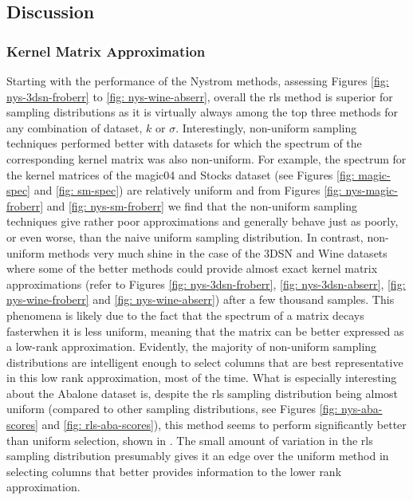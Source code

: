 \subsection{Discussion}\label{Section5.3}

\subsubsection{Kernel Matrix Approximation}\label{Section5.3.1}

Starting with the performance of the Nystrom methods, assessing Figures \ref{fig: nys-3dsn-froberr} to \ref{fig: nys-wine-abserr}, overall the rls method is superior for sampling distributions as it is virtually always among the top three methods for any combination of dataset, $k$ or $\sigma$. Interestingly, non-uniform sampling techniques performed better with datasets for which the spectrum of the corresponding kernel matrix was also non-uniform. For example, the spectrum for the kernel matrices of the magic04 and Stocks dataset (see Figures \ref{fig: magic-spec} and \ref{fig: sm-spec}) are relatively uniform and from Figures \ref{fig: nys-magic-froberr} and \ref{fig: nys-sm-froberr} we find that the non-uniform sampling techniques give rather poor approximations and generally behave just as poorly, or even worse, than the naive uniform sampling distribution. In contrast, non-uniform methods very much shine in the case of the 3DSN and Wine datasets where some of the better methods could provide almost exact kernel matrix approximations (refer to Figures \ref{fig: nys-3dsn-froberr}, \ref{fig: nys-3dsn-abserr}, \ref{fig: nys-wine-froberr} and \ref{fig: nys-wine-abserr}) after a few thousand samples. This phenomena is likely due to the fact that the spectrum of a matrix decays fasterwhen it is less uniform, meaning that the matrix can be better expressed as a low-rank approximation. Evidently, the majority of non-uniform sampling distributions are intelligent enough to select columns that are best representative in this low rank approximation, most of the time. What is especially interesting about the Abalone dataset is, despite the rls sampling distribution being almost uniform (compared to other sampling distributions, see Figures \ref{fig: nys-aba-scores} and \ref{fig: rls-aba-scores}), this method seems to perform significantly better than uniform selection, shown in . The small amount of variation in the rls sampling distribution presumably gives it an edge over the uniform method in selecting columns that better provides information to the lower rank approximation.

